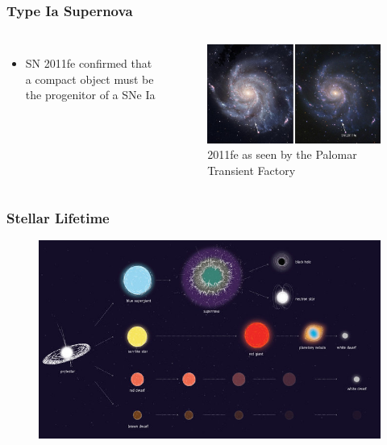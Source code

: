 \documentclass{beamer}
\begin{document}
\begin{frame}
\frametitle{Type Ia Supernova}

\begin{columns}[c]
        \begin{itemize}
                \item SN 2011fe confirmed that a compact object must be the progenitor of a SNe Ia
        \end{itemize}


        \begin{figure}
    \begin{center}
      \includegraphics[width=.90\linewidth]{2011fe.jpg}
            \caption{2011fe as seen by the Palomar Transient Factory}
    \end{center}
  \end{figure}

        \end{columns}

\end{frame}






\begin{frame}
\frametitle{Stellar Lifetime}

        \begin{figure}
    \begin{center}
      \includegraphics[width=.90\linewidth]{Stellar_evolution_.jpg}
    \end{center}
  \end{figure}


\end{frame}
\end{document}
